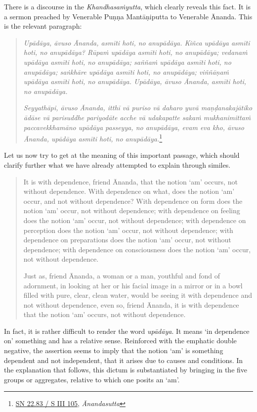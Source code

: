There is a discourse in the \emph{Khandhasaṁyutta}, which clearly reveals this fact. It is a sermon preached by Venerable Puṇṇa Mantāṇiputta to Venerable Ānanda. This is the relevant paragraph:

\begin{quote}
\emph{Upādāya, āvuso Ānanda, asmīti hoti, no anupādāya. Kiñca upādāya asmīti hoti, no anupādāya? Rūpaṁ upādāya asmīti hoti, no anupādāya; vedanaṁ upādāya asmīti hoti, no anupādāya; saññaṁ upādāya asmīti hoti, no anupādāya; saṅkhāre upādāya asmīti hoti, no anupādāya; viññāṇaṁ upādāya asmīti hoti, no anupādāya. Upādāya, āvuso Ānanda, asmīti hoti, no anupādāya.}

\emph{Seyyathāpi, āvuso Ānanda, itthī vā puriso vā daharo yuvā maṇḍanakajātiko ādāse vā parisuddhe pariyodāte acche vā udakapatte sakaṁ mukhanimittaṁ paccavekkhamāno upādāya passeyya, no anupādāya, evam eva kho, āvuso Ānanda, upādāya asmīti hoti, no anupādāya.}\footnote{\href{https://suttacentral.net/sn22.83/pli/ms}{SN 22.83 / S III 105}, \emph{Ānandasutta}}
\end{quote}

Let us now try to get at the meaning of this important passage, which should clarify further what we have already attempted to explain through similes.

\begin{quote}
It is with dependence, friend Ānanda, that the notion `am' occurs, not without dependence. With dependence on what, does the notion `am' occur, and not without dependence? With dependence on form does the notion `am' occur, not without dependence; with dependence on feeling does the notion `am' occur, not without dependence; with dependence on perception does the notion `am' occur, not without dependence; with dependence on preparations does the notion `am' occur, not without dependence; with dependence on consciousness does the notion `am' occur, not without dependence.

Just as, friend Ānanda, a woman or a man, youthful and fond of adornment, in looking at her or his facial image in a mirror or in a bowl filled with pure, clear, clean water, would be seeing it with dependence and not without dependence, even so, friend Ānanda, it is with dependence that the notion `am' occurs, not without dependence.
\end{quote}

In fact, it is rather difficult to render the word \emph{upādāya}. It means `in dependence on' something and has a relative sense. Reinforced with the emphatic double negative, the assertion seems to imply that the notion `am' is something dependent and not independent, that it arises due to causes and conditions. In the explanation that follows, this dictum is substantiated by bringing in the five groups or aggregates, relative to which one posits an `am'.

